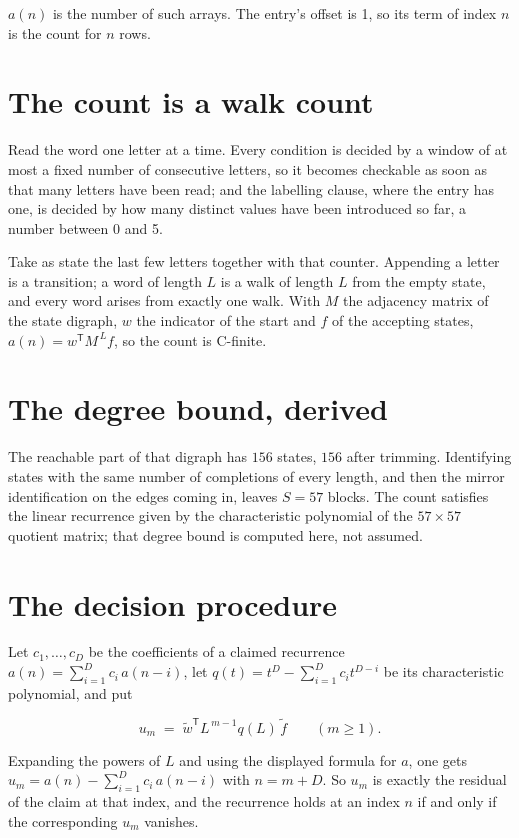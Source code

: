 \documentclass[11pt]{article}
\theoremstyle{definition}
\begin{document}
$a(n)$ is the number of such arrays. The entry's offset is 1, so its term of index $n$ is the count for $n$ rows.

\section{The count is a walk count}

Read the word one letter at a time. Every condition is decided by a window of at most a fixed number of consecutive letters, so it becomes checkable as soon as that many letters have been read; and the labelling clause, where the entry has one, is decided by how many distinct values have been introduced so far, a number between $0$ and 5.

Take as state the last few letters together with that counter. Appending a letter is a transition; a word of length $L$ is a walk of length $L$ from the empty state, and every word arises from exactly one walk. With $M$ the adjacency matrix of the state digraph, $w$ the indicator of the start and $f$ of the accepting states, $a(n) = w^{\mathsf T}M^{\,L}f$, so the count is C-finite.

\section{The degree bound, derived}

The reachable part of that digraph has $156$ states, $156$ after trimming. Identifying states with the same number of completions of every length, and then the mirror identification on the edges coming in, leaves $S = 57$ blocks. The count satisfies the linear recurrence given by the characteristic polynomial of the $57\times57$ quotient matrix; that degree bound is computed here, not assumed.

\section{The decision procedure}

Let $c_1,\dots,c_D$ be the coefficients of a claimed recurrence $a(n) = \sum_{i=1}^{D} c_i\,a(n-i)$, let $q(t) = t^{D} - \sum_{i=1}^{D} c_i t^{D-i}$ be its characteristic polynomial, and put

\[u_m \;=\; \tilde w^{\mathsf T} L^{\,m-1} q(L)\,\tilde f \qquad (m \ge 1).\]

Expanding the powers of $L$ and using the displayed formula for $a$, one gets $u_m = a(n) - \sum_{i=1}^{D} c_i\,a(n-i)$ with $n = m + D$. So $u_m$ is exactly the residual of the claim at that index, and the recurrence holds at an index $n$ if and only if the corresponding $u_m$ vanishes.
\end{document}
